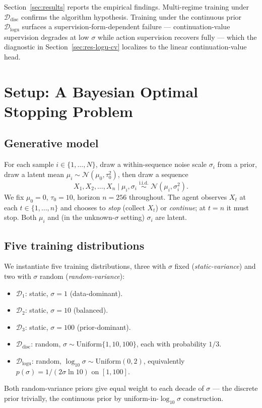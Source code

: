 \documentclass[11pt]{article}
\begin{document}
Section~\ref{sec:results} reports the empirical findings. Multi-regime training under $\mathcal{D}_{\mathrm{disc}}$ confirms the algorithm hypothesis. Training under the continuous prior $\mathcal{D}_{\mathrm{logu}}$ surfaces a supervision-form-dependent failure --- continuation-value supervision degrades at low $\sigma$ while action supervision recovers fully --- which the diagnostic in Section~\ref{sec:res-logu-cv} localizes to the linear continuation-value head.

\section{Setup: A Bayesian Optimal Stopping Problem}
\label{sec:setup}

\subsection{Generative model}

For each sample $i \in \{1, \ldots, N\}$, draw a within-sequence noise scale $\sigma_i$ from a prior, draw a latent mean $\mu_i \sim \mathcal{N}(\mu_0, \tau_0^2)$, then draw a sequence
\[
X_1, X_2, \ldots, X_n \mid \mu_i, \sigma_i \;\overset{\text{i.i.d.}}{\sim}\; \mathcal{N}(\mu_i, \sigma_i^2).
\]
We fix $\mu_0 = 0$, $\tau_0 = 10$, horizon $n = 256$ throughout. The agent observes $X_t$ at each $t \in \{1, \ldots, n\}$ and chooses to \emph{stop} (collect $X_t$) or \emph{continue}; at $t = n$ it must stop. Both $\mu_i$ and (in the unknown-$\sigma$ setting) $\sigma_i$ are latent.

\subsection{Five training distributions}

We instantiate five training distributions, three with $\sigma$ fixed (\emph{static-variance}) and two with $\sigma$ random (\emph{random-variance}):
\begin{itemize}
\item $\mathcal{D}_1$: static, $\sigma = 1$ (data-dominant).
\item $\mathcal{D}_2$: static, $\sigma = 10$ (balanced).
\item $\mathcal{D}_3$: static, $\sigma = 100$ (prior-dominant).
\item $\mathcal{D}_{\mathrm{disc}}$: random, $\sigma \sim \mathrm{Uniform}\{1, 10, 100\}$, each with probability $1/3$.
\item $\mathcal{D}_{\mathrm{logu}}$: random, $\log_{10}\sigma \sim \mathrm{Uniform}(0, 2)$, equivalently $p(\sigma) = 1/(2\sigma\ln 10)$ on $[1, 100]$.
\end{itemize}
Both random-variance priors give equal weight to each decade of $\sigma$ --- the discrete prior trivially, the continuous prior by uniform-in-$\log_{10}\sigma$ construction.
\end{document}
